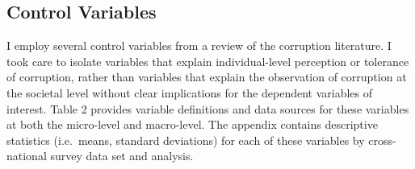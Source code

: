 \documentclass[11pt,]{article}
\begin{document}
\subsection{Control Variables}\label{control-variables}

I employ several control variables from a review of the corruption
literature. I took care to isolate variables that explain
individual-level perception or tolerance of corruption, rather than
variables that explain the observation of corruption at the societal
level without clear implications for the dependent variables of
interest. Table 2 provides variable definitions and data sources for
these variables at both the micro-level and macro-level. The appendix
contains descriptive statistics (i.e.~means, standard deviations) for
each of these variables by cross-national survey data set and analysis.
\end{document}
